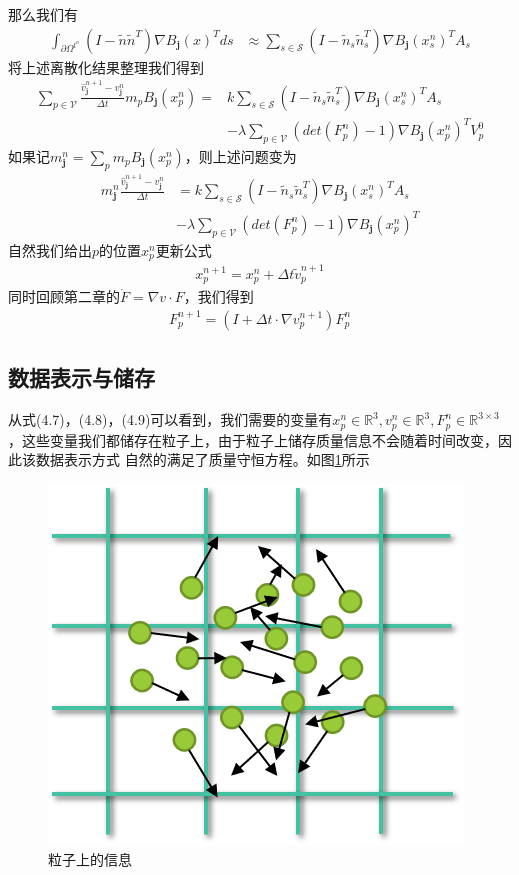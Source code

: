 那么我们有
\begin{align}
    \int_{\partial \Omega^{t^n}} (I - \tilde{n}\tilde{n}^T)\nabla B_{\mathbf{j}}(x)^T ds &\approx \sum_{s\in\mathcal{S}}(I - \tilde{n}_s\tilde{n}_s^T)\nabla B_{\mathbf{j}}(x_s^n)^TA_s
\end{align}
将上述离散化结果整理我们得到
\begin{align}
    \sum_{p\in \mathcal{V}} \frac{\hat{v}^{n+1}_\mathbf{j} - v^n_{\mathbf{j}}}{\Delta t}m_pB_{\mathbf{j}}(x_p^n) = &k\sum_{s\in\mathcal{S}}(I - \tilde{n}_s\tilde{n}_s^T)\nabla B_{\mathbf{j}}(x_s^n)^TA_s\nonumber\\
    & - \lambda \sum_{p\in\mathcal{V}} (det(F_p^n) - 1)\nabla B_{\mathbf{j}}(x_p^n)^T V_p^0
\end{align}
如果记$m_{\mathbf{j}}^n = \sum_p m_p B_{\mathbf{j}}(x_p^n)$，则上述问题变为
\begin{align}
    m_\mathbf{j}^n \frac{\hat{v}^{n+1}_\mathbf{j} - v^n_{\mathbf{j}}}{\Delta t} &= k\sum_{s\in \mathcal{S}}(I - \tilde{n}_s\tilde{n}_s^T)\nabla B_\mathbf{j}(x_s^n)^TA_s\nonumber\\
    & - \lambda \sum_{p\in\mathcal{V}} (det(F_p^n) - 1)\nabla B_{\mathbf{j}}(x_p^n)^T 
\end{align}
自然我们给出$p$的位置$x_p^n$更新公式
\begin{align}    
    x_p^{n+1} = x_p^n + \Delta t \tilde{v}_p^{n+1}
\end{align}
同时回顾第二章的$\dot{F} = \nabla v \cdot F$，我们得到
\begin{align}
    F^{n+1}_p = (I + \Delta t\cdot \nabla {v}^{n+1}_p)F^n_p
\end{align}

\subsection{数据表示与储存}
从式(4.7)，(4.8)，(4.9)可以看到，我们需要的变量有$x_p^n\in \mathbb{R}^3,v_p^{n}\in \mathbb{R}^3,F_p^n\in \mathbb{R}^{3\times 3}$，这些变量我们都储存在粒子上，由于粒子上储存质量信息不会随着时间改变，因此该数据表示方式
自然的满足了质量守恒方程。如图\ref{fig: particle information}所示
\begin{figure}[htbp]
    \centering
    \includegraphics[scale=0.7]{./images/image13.png}
    \caption{粒子上的信息}
    \label{fig: particle information}
\end{figure}


